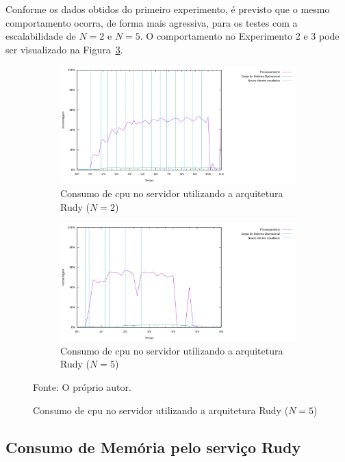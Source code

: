 Conforme os dados obtidos do primeiro experimento, é previsto que o mesmo comportamento ocorra, de forma mais agressiva, para os testes com a escalabilidade de $N=2$ e $N=5$.
%
O comportamento no Experimento 2 e 3 pode ser visualizado na Figura~\ref{fig:rudy_t56_cpu}.

\begin{figure}[htb!]
    \caption{Topologia da rede no gestor de redes do OpenStack.}
    \centering
    \begin{subfigure}{1.0\textwidth}
      \centering
      \includegraphics[width=.9\textwidth]{metricas_rudy_t5/cpu.png}
      \caption{Consumo de \ac{cpu} no servidor utilizando a arquitetura Rudy ($N=2$)}
      \label{fig:rudy_t5_cpu}
    \end{subfigure}


    \begin{subfigure}{1.0\textwidth}
      \centering
      \includegraphics[width=.9\textwidth]{metricas_rudy_t6/cpu.png}
      \caption{Consumo de \ac{cpu} no servidor utilizando a arquitetura Rudy ($N=5$)}
      \label{fig:rudy_t6_cpu}
    \end{subfigure}
    \label{fig:rudy_t56_cpu}

    Fonte: O próprio autor.
\end{figure}


\subsection{Consumo de Memória pelo serviço Rudy}


